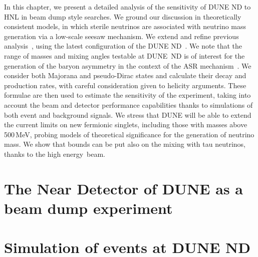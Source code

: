 In this chapter, we present a detailed analysis of the sensitivity of DUNE ND to HNL in beam dump style searches.
We ground our discussion in theoretically consistent models, in which sterile neutrinos %
are associated with neutrino mass generation via a low-scale seesaw mechanism.
We extend and refine previous analysis~\cite{Krasnov:2019kdc, Adams:2013qkq}, %
using the latest configuration of the DUNE ND~\cite{DUNETDR:2019, DUNEND:2019}.
We note that the range of masses and mixing angles testable at DUNE~ND is of interest for the generation of %
the baryon asymmetry in the context of the ASR mechanism~\cite{Akhmedov:1998qx, Asaka:2005pn, Hernandez:2015wna, Hernandez:2016kel, Drewes:2017zyw}.
We consider both Majorana and pseudo-Dirac states and calculate their decay and production rates, 
with careful consideration given to helicity arguments.
These formulae are then used to estimate the sensitivity of the experiment, %
taking into account the beam and detector performance capabilities thanks to simulations of both event and background signals.
We stress that DUNE will be able to extend the current limits on new fermionic singlets, %
including those with masses above 500\,MeV, probing models of theoretical significance for the generation of neutrino mass.
We show that bounds can be put also on the mixing with tau neutrinos, thanks to the high energy~beam.

\section{The Near Detector of DUNE as a beam dump experiment}
\label{sec:beamdump}

\section{Simulation of events at DUNE ND}
\label{sec:experiment}

